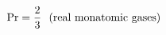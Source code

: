 \documentclass[preview]{standalone}
\begin{document}
\begin{align*}
\special{dvisvgm:raw <g id='unique000'>}\mathrm{Pr}=\frac23\ \ \text{(real monatomic gases)}\special{dvisvgm:raw </g>}
\end{align*}
\end{document}

